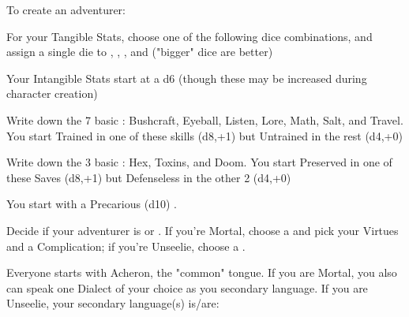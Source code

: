 {  

To create an adventurer:


For your Tangible Stats, choose one of the following dice combinations, and assign a single die to \VIG, \DEX, \INT, and \FOC ("bigger" dice are better)


Your Intangible Stats start at a d6 (though these may be increased during character creation)



Write down the 7 basic : Bushcraft, Eyeball, Listen, Lore, Math, Salt, and Travel.  You start Trained in one of these skills (d8,+1) but Untrained in the rest (d4,+0)


Write down the 3 basic :  Hex, Toxins, and Doom.  You start Preserved in one of these Saves (d8,+1) but Defenseless in the other 2 (d4,+0)


You start with a Precarious (d10) \DEATH.



Decide if your adventurer is  or .  If you're Mortal, choose a  and pick your Virtues and a Complication; if you're Unseelie, choose a .


Everyone starts with Acheron, the "common" tongue. If you are Mortal, you also can speak one Dialect of your choice as you secondary language.  If you are Unseelie, your secondary language(s) is/are:


}
